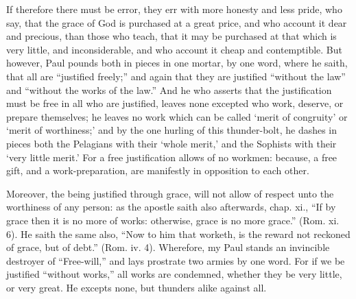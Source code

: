 If therefore there must be error, they err with more honesty and less pride, who say, that the grace of God is purchased at a great price, and who account it dear and precious, than those who teach, that it may be purchased at that which is very little, and inconsiderable, and who account it cheap and contemptible. But however, Paul pounds both in pieces in one mortar, by one word, where he saith, that all are “justified freely;” and again that they are justified “without the law” and “without the works of the law.” And he who asserts that the justification must be free in all who are justified, leaves none excepted who work, deserve, or prepare themselves; he leaves no work which can be called ‘merit of congruity’ or ‘merit of worthiness;’ and by the one hurling of this thunder-bolt, he dashes in pieces both the Pelagians with their ‘whole merit,’ and the Sophists with their ‘very little merit.’ For a free justification allows of no workmen: because, a free gift, and a work-preparation, are manifestly in opposition to each other.

Moreover, the being justified through grace, will not allow of respect unto the worthiness of any person: as the apostle saith also afterwards, chap. xi., “If by grace then it is no more of works: otherwise, grace is no more grace.” (Rom. xi. 6). He saith the same also, “Now to him that worketh, is the reward not reckoned of grace, but of debt.” (Rom. iv. 4). Wherefore, my Paul stands an invincible destroyer of “Free-will,” and lays prostrate two armies by one word. For if we be justified “without works,” all works are condemned, whether they be very little, or very great. He excepts none, but thunders alike against all.


